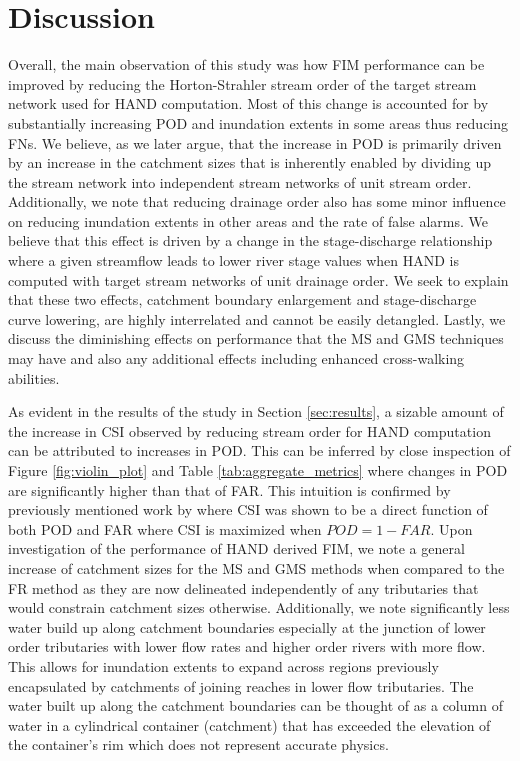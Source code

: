 \section{Discussion}
\label{sec:discussion}
%
Overall, the main observation of this study was how FIM performance can be improved by reducing the Horton-Strahler stream order of the target stream network used for HAND computation.
Most of this change is accounted for by substantially increasing POD and inundation extents in some areas thus reducing FNs.
We believe, as we later argue, that the increase in POD is primarily driven by an increase in the catchment sizes that is inherently enabled by dividing up the stream network into independent stream networks of unit stream order.
Additionally, we note that reducing drainage order also has some minor influence on reducing inundation extents in other areas and the rate of false alarms.
We believe that this effect is driven by a change in the stage-discharge relationship where a given streamflow leads to lower river stage values when HAND is computed with target stream networks of unit drainage order.
We seek to explain that these two effects, catchment boundary enlargement and stage-discharge curve lowering, are highly interrelated and cannot be easily detangled.
Lastly, we discuss the diminishing effects on performance that the MS and GMS techniques may have and also any additional effects including enhanced cross-walking abilities.

As evident in the results of the study in Section \ref{sec:results}, a sizable amount of the increase in CSI observed by reducing stream order for HAND computation can be attributed to increases in POD.
This can be inferred by close inspection of Figure \ref{fig:violin_plot} and Table \ref{tab:aggregate_metrics} where changes in POD are significantly higher than that of FAR.
This intuition is confirmed by previously mentioned work by  where CSI was shown to be a direct function of both POD and FAR where CSI is maximized when $POD = 1 - FAR$.
Upon investigation of the performance of HAND derived FIM, we note a general increase of catchment sizes for the MS and GMS methods when compared to the FR method as they are now delineated independently of any tributaries that would constrain catchment sizes otherwise.
Additionally, we note significantly less water build up along catchment boundaries especially at the junction of lower order tributaries with lower flow rates and higher order rivers with more flow.
This allows for inundation extents to expand across regions previously encapsulated by catchments of joining reaches in lower flow tributaries.
The water built up along the catchment boundaries can be thought of as a column of water in a cylindrical container (catchment) that has exceeded the elevation of the container's rim which does not represent accurate physics.

